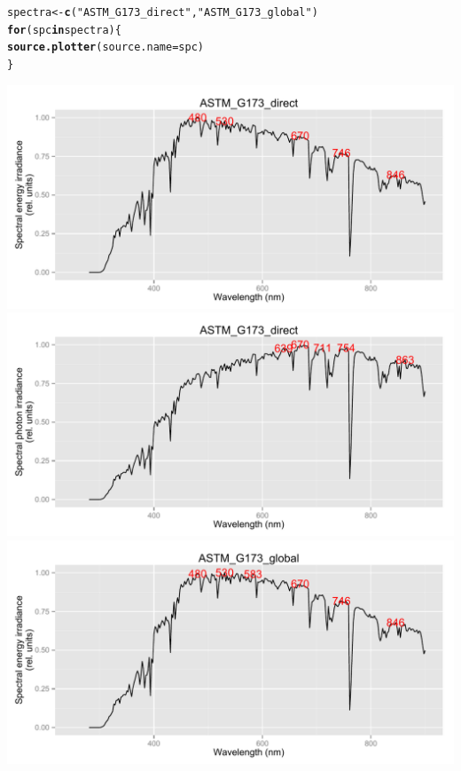 \documentclass{article}\usepackage[]{graphicx}\usepackage[]{color}
\makeatletter
\newcommand{\hlstr}[1]{\textcolor[rgb]{0.192,0.494,0.8}{#1}}%
\newcommand{\hlstd}[1]{\textcolor[rgb]{0.345,0.345,0.345}{#1}}%
\newcommand{\hlkwa}[1]{\textcolor[rgb]{0.161,0.373,0.58}{\textbf{#1}}}%
\newcommand{\hlkwb}[1]{\textcolor[rgb]{0.69,0.353,0.396}{#1}}%
\newcommand{\hlkwc}[1]{\textcolor[rgb]{0.333,0.667,0.333}{#1}}%
\newcommand{\hlkwd}[1]{\textcolor[rgb]{0.737,0.353,0.396}{\textbf{#1}}}%
\newenvironment{kframe}{%
 \def\at@end@of@kframe{}%
 \ifinner\ifhmode%
  \def\at@end@of@kframe{\end{minipage}}%
  \begin{minipage}{\columnwidth}%
 \fi\fi%
 \def\FrameCommand##1{\hskip\@totalleftmargin \hskip-\fboxsep
 \colorbox{shadecolor}{##1}\hskip-\fboxsep
     \hskip-\linewidth \hskip-\@totalleftmargin \hskip\columnwidth}%
 \MakeFramed {\advance\hsize-\width
   \@totalleftmargin\z@ \linewidth\hsize
   \@setminipage}}%
 {\par\unskip\endMakeFramed%
 \at@end@of@kframe}
\newenvironment{knitrout}{}{} %
\makeatother
\begin{document}
\begin{knitrout}\footnotesize
{}\color{fgcolor}\begin{kframe}
\begin{alltt}
\hlstd{spectra} \hlkwb{<-} \hlkwd{c}\hlstd{(}\hlstr{"ASTM_G173_direct"}\hlstd{,} \hlstr{"ASTM_G173_global"}\hlstd{)}
\hlkwa{for} \hlstd{(spc} \hlkwa{in} \hlstd{spectra) \{}
    \hlkwd{source.plotter}\hlstd{(}\hlkwc{source.name} \hlstd{= spc)}
\hlstd{\}}
\end{alltt}
\end{kframe}

{\centering \includegraphics[width=.95\textwidth]{figure/pos-terrestrial-std1} 
\includegraphics[width=.95\textwidth]{figure/pos-terrestrial-std2} 
\includegraphics[width=.95\textwidth]{figure/pos-terrestrial-std3} 
}
\end{knitrout}
\end{document}

